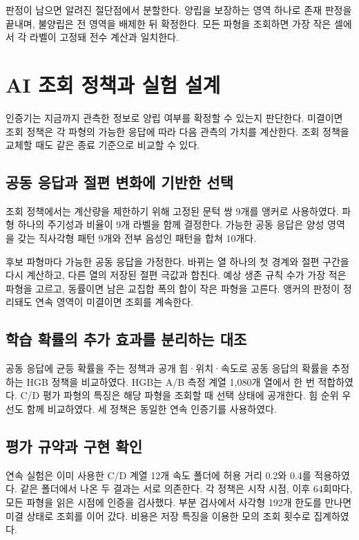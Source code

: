 \documentclass[11pt,a4paper]{article}
\begin{document}
판정이 남으면 알려진 절단점에서 분할한다. 양립을 보장하는 영역 하나로 존재 판정을 끝내며, 불양립은 전 영역을 배제한 뒤 확정한다. 모든 파형을 조회하면 가장 작은 셀에서 각 라벨이 고정돼 전수 계산과 일치한다.

\clearpage
\section{AI 조회 정책과 실험 설계}
\noindent{}
\par\medskip
인증기는 지금까지 관측한 정보로 양립 여부를 확정할 수 있는지 판단한다. 미결이면 조회 정책은 각 파형의 가능한 응답에 따라 다음 관측의 가치를 계산한다. 조회 정책을 교체할 때도 같은 종료 기준으로 비교할 수 있다.

\subsection*{공동 응답과 절편 변화에 기반한 선택}
조회 정책에서는 계산량을 제한하기 위해 고정된 문턱 쌍 9개를 앵커로 사용하였다. 파형 하나의 주기성과 비율이 9개 라벨을 함께 결정한다. 가능한 공동 응답은 양성 영역을 갖는 직사각형 패턴 9개와 전부 음성인 패턴을 합쳐 10개다.

후보 파형마다 가능한 공동 응답을 가정한다. 바뀌는 열 하나의 첫 경계와 절편 구간을 다시 계산하고, 다른 열의 저장된 절편 극값과 합친다. 예상 생존 규칙 수가 가장 적은 파형을 고르고, 동률이면 남은 교집합 폭의 합이 작은 파형을 고른다. 앵커의 판정이 정리돼도 연속 영역이 미결이면 조회를 계속한다.

\subsection*{학습 확률의 추가 효과를 분리하는 대조}
공동 응답에 균등 확률을 주는 정책과 공개 힘·위치·속도로 공동 응답의 확률을 추정하는 HGB 정책을 비교하였다. HGB는 A/B 측정 계열 1,080개 열에서 한 번 적합하였다. C/D 평가 파형의 특징은 해당 파형을 조회할 때 선택 상태에 공개한다. 힘 순위 우선도 함께 비교하였다. 세 정책은 동일한 연속 인증기를 사용하였다.

\subsection*{평가 규약과 구현 확인}
연속 실험은 이미 사용한 C/D 계열 12개 속도 폴더에 허용 거리 0.2와 0.4를 적용하였다. 같은 폴더에서 나온 두 결과는 서로 의존한다. 각 정책은 시작 시점, 이후 64회마다, 모든 파형을 읽은 시점에 인증을 검사했다. 부분 검사에서 사각형 192개 한도를 만나면 미결 상태로 조회를 이어 갔다. 비용은 저장 특징을 이용한 모의 조회 횟수로 집계하였다.
\end{document}
